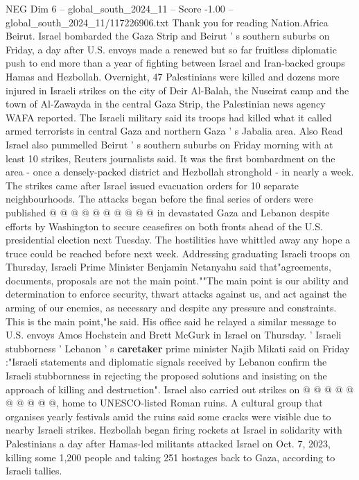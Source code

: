 \begin{textsample}{NEG Dim 6 – global\_south\_2024\_11 – Score -1.00 – global\_south\_2024\_11/117226906.txt}  \label{ex:f6_neg_070}
Thank you for reading Nation.Africa Beirut.
Israel bombarded the Gaza Strip and Beirut ' s southern suburbs on Friday, a day after U.S. envoys made a renewed but so far fruitless diplomatic push to end more than a year of fighting between Israel and Iran-backed groups Hamas and Hezbollah.
Overnight, 47 Palestinians were killed and dozens more injured in Israeli strikes on the city of Deir Al-Balah, the Nuseirat camp and the town of Al-Zawayda in the central Gaza Strip, the Palestinian news agency WAFA reported.
The Israeli military said its troops had killed what it called armed terrorists in central Gaza and northern Gaza ' s Jabalia area.
Also Read Israel also pummelled Beirut ' s southern suburbs on Friday morning with at least 10 strikes, Reuters journalists said.
It was the first bombardment on the area - once a densely-packed district and Hezbollah stronghold - in nearly a week.
The strikes came after Israel issued evacuation orders for 10 separate neighbourhoods.
The attacks began before the final series of orders were published @ @ @ @ @ @ @ @ @ @ in devastated Gaza and Lebanon despite efforts by Washington to secure ceasefires on both fronts ahead of the U.S. presidential election next Tuesday.
The hostilities have whittled away any hope a truce could be reached before next week.
Addressing graduating Israeli troops on Thursday, Israeli Prime Minister Benjamin Netanyahu said that"agreements, documents, proposals are not the main point.""The main point is our ability and determination to enforce security, thwart attacks against us, and act against the arming of our enemies, as necessary and despite any pressure and constraints.
This is the main point,"he said.
His office said he relayed a similar message to U.S. envoys Amos Hochstein and Brett McGurk in Israel on Thursday. ' Israeli stubborness ' Lebanon ' s \textbf{caretaker} prime minister Najib Mikati said on Friday :"Israeli statements and diplomatic signals received by Lebanon confirm the Israeli stubbornness in rejecting the proposed solutions and insisting on the approach of killing and destruction".
Israel also carried out strikes on @ @ @ @ @ @ @ @ @ @, home to UNESCO-listed Roman ruins.
A cultural group that organises yearly festivals amid the ruins said some cracks were visible due to nearby Israeli strikes.
Hezbollah began firing rockets at Israel in solidarity with Palestinians a day after Hamas-led militants attacked Israel on Oct. 7, 2023, killing some 1,200 people and taking 251 hostages back to Gaza, according to Israeli tallies.

\end{textsample}
